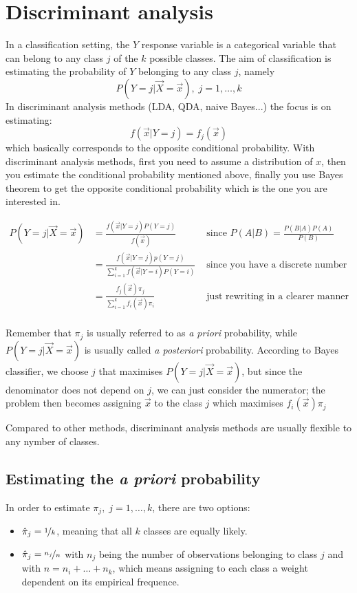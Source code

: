 \chapter{Discriminant analysis} 

  In a classification setting, the $Y$ response variable is a categorical variable that can belong to any class $j$ of the $k$ possible classes. The aim of classification is estimating the probability of $Y$ belonging to any class $j$, namely 
  $$P(Y=j|\vec{X}=\vec{x}),\; j = 1, \dots, k$$
  In discriminant analysis methods (LDA, QDA, naive Bayes...) the focus is on estimating:
  $$f(\vec{x}|Y=j) = f_j(\vec{x})$$
  which basically corresponds to the opposite conditional probability. 
  With discriminant analysis methods, first you need to assume a distribution of $x$, then you estimate the conditional probability mentioned above, finally you use Bayes theorem to get the opposite conditional probability which is the one you are interested in.

  \begin{align*}
  P(Y=j|\vec{X}=\vec{x})  
    &= \frac{f(\vec{x}|Y=j)P(Y=j)}{f(\vec{x})}
    & \text{ since } P(A|B) = \frac{P(B|A)P(A)}{P(B)} \\
    &= \frac{f(\vec{x}|Y=j)p(Y=j)}{\sum_{i = 1}^k f(\vec{x}|Y = i)P(Y=i)}
    & \text{ since you have a discrete number of classes} \\
    &= \frac{f_j(\vec{x})\pi_j}{\sum_{i = 1}^k f_i(\vec{x})\pi_i}
    & \text{ just rewriting in a clearer manner} \\
  \end{align*}

  Remember that $\pi_j$ is usually referred to as \textit{a priori} probability, while $P(Y=j|\vec{X}=\vec{x})$ is usually called \textit{a posteriori} probability.
  According to Bayes classifier, we choose $j$ that maximises $P(Y=j|\vec{X}=\vec{x})$, but since the denominator does not depend on $j$, we can just consider the numerator; the problem then becomes assigning $\vec{x}$ to the class $j$ which maximises $f_i(\vec{x})\pi_j$

  
  Compared to other methods, discriminant analysis methods are usually flexible to any nymber of classes.

  \section{Estimating the \textit{a priori} probability}
    In order to estimate $\pi_j, \; j=1, \dots, k$, there are two options:
    \begin{itemize}
      \item $\hat{\pi}_j = \nicefrac{1}{k}$, meaning that all $k$ classes are equally likely.
      \item $\hat{\pi}_j = \nicefrac{n_j}{n}$ with $n_j$ being the number of observations belonging to class $j$ and with $n = n_i + \dots + n_k$, which means assigning to each class a weight dependent on its empirical frequence. 
    \end{itemize}
  

